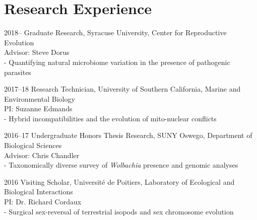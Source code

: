 \documentclass[12pt,letterpaper]{report}
\begin{document}
    \section*{Research Experience}

    \begin{tablist}
    
    	\item[2018--] \tab Graduate Research, Syracuse University, Center for Reproductive Evolution \\
    					   Advisor: Steve Dorus \\
    					   - Quantifying natural microbiome variation in the presence of pathogenic parasites%

        \item[2017--18] \tab Research Technician, University of Southern California, Marine and Environmental Biology \\
                            PI: Suzanne Edmands \\
                            - Hybrid incompatibilities and the evolution of mito-nuclear conflicts%

        \item[2016--17] \tab Undergraduate Honors Thesis Research, SUNY Oswego, Department of Biological Sciences \\
                            Advisor: Chris Chandler \\
                            - Taxonomically diverse survey of {{\emph{Wolbachia}}} presence and genomic analyses%
		
		\item[2016] \tab Visiting Scholar, Université de Poitiers, Laboratory of Ecological and Biological Interactions \\
                            PI: Dr. Richard Cordaux \\
                            - Surgical sex-reversal of terrestrial isopods and sex chromosome evolution%

    \end{tablist}
\end{document}
